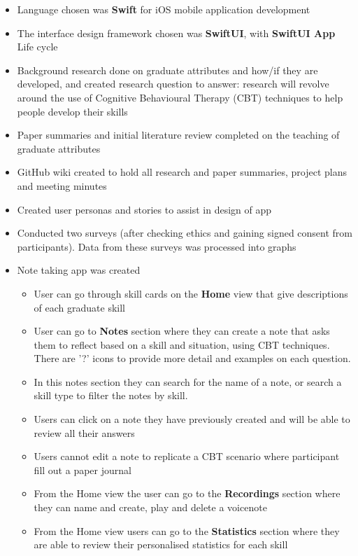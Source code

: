 \documentclass[11pt]{article}
\begin{document}
\begin{itemize}
    \item Language chosen was \textbf{Swift} for iOS mobile application development
    \item The interface design framework chosen was \textbf{SwiftUI}, with \textbf{SwiftUI App} Life cycle
    \item Background research done on graduate attributes and how/if they are developed, and created research question to answer: research will revolve around the use of Cognitive Behavioural Therapy (CBT) techniques to help people develop their skills
    \item Paper summaries and initial literature review completed on the teaching of graduate attributes
    \item GitHub wiki created to hold all research and paper summaries, project plans and meeting minutes
    \item Created user personas and stories to assist in design of app
    \item Conducted two surveys (after checking ethics and gaining signed consent from participants). Data from these surveys was processed into graphs
    \item Note taking app was created
    \begin{itemize}
        \item User can go through skill cards on the \textbf{Home} view that give descriptions of each graduate skill
        \item User can go to \textbf{Notes} section where they can create a note that asks them to reflect based on a skill and situation, using CBT techniques. There are '?' icons to provide more detail and examples on each question. 
        \item In this notes section they can search for the name of a note, or search a skill type to filter the notes by skill. 
        \item Users can click on a note they have previously created and will be able to review all their answers
        \item Users cannot edit a note to replicate a CBT scenario where participant fill out a paper journal
        \item From the Home view the user can go to the \textbf{Recordings} section where they can name and create, play and delete a voicenote
        \item From the Home view users can go to the \textbf{Statistics} section where they are able to review their personalised statistics for each skill

\end{itemize}
\end{itemize}
\end{document}

